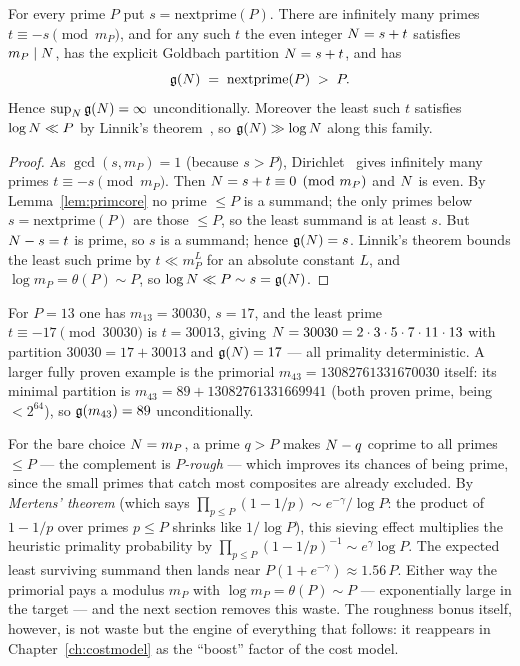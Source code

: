 \begin{theorem}\label{thm:dirichlet}
For every prime $P$ put $s=\mathrm{nextprime}(P)$. There are infinitely
many primes $t\equiv-s\pmod{m_P}$, and for any such $t$ the even integer
$N=s+t$ satisfies $m_P\mid N$, has the explicit Goldbach partition
$N=s+t$, and has
\[
\mathfrak{g}(N)\;=\;\mathrm{nextprime}(P)\;>\;P.
\]
Hence $\sup_N\mathfrak{g}(N)=\infty$ unconditionally. Moreover the least such
$t$ satisfies $\log N\ll P$ by Linnik's theorem~\cite{Linnik}, so
$\mathfrak{g}(N)\gg\log N$ along this family.
\end{theorem}
\begin{proof}
As $\gcd(s,m_P)=1$ (because $s>P$), Dirichlet~\cite{Dirichlet} gives
infinitely many primes $t\equiv-s\pmod{m_P}$. Then
$N=s+t\equiv0\pmod{m_P}$ and $N$ is even. By Lemma~\ref{lem:primcore}
no prime $\le P$ is a summand; the only primes below
$s=\mathrm{nextprime}(P)$ are those $\le P$, so the least summand is at
least $s$. But $N-s=t$ is prime, so $s$ is a summand; hence
$\mathfrak{g}(N)=s$. Linnik's theorem bounds the least such prime by
$t\ll m_P^{L}$ for an absolute constant $L$, and
$\log m_P=\theta(P)\sim P$, so $\log N\ll P\sim s=\mathfrak{g}(N)$.
\end{proof}

\begin{remark}\label{rem:concrete}
For $P=13$ one has $m_{13}=30030$, $s=17$, and the least prime
$t\equiv-17\pmod{30030}$ is $t=30013$, giving
$N=30030=2\cdot3\cdot5\cdot7\cdot11\cdot13$ with partition
$30030=17+30013$ and $\mathfrak{g}(N)=17$ --- all primality deterministic. A
larger fully proven example is the primorial
$m_{43}=13082761331670030$ itself: its minimal partition is
$m_{43}=89+13082761331669941$ (both proven prime, being $<2^{64}$), so
$\mathfrak{g}(m_{43})=89$ unconditionally.
\end{remark}

\begin{remark}\label{rem:rough}
For the bare choice $N=m_P$, a prime $q>P$ makes $N-q$ coprime to all
primes $\le P$ --- the complement is \emph{$P$-rough} --- which improves
its chances of being prime, since the small primes that catch most
composites are already excluded. By \emph{Mertens' theorem} (which says
$\prod_{p\le P}(1-1/p)\sim e^{-\gamma}/\log P$: the product of $1-1/p$
over primes $p\le P$ shrinks like $1/\log P$), this sieving effect
multiplies the heuristic primality probability by
$\prod_{p\le P}(1-1/p)^{-1}\sim e^\gamma\log P$. The expected least
surviving summand then lands near $P(1+e^{-\gamma})\approx1.56\,P$.
Either way the primorial pays a modulus $m_P$ with
$\log m_P=\theta(P)\sim P$ --- exponentially large in the target --- and
the next section removes this waste. The roughness bonus itself,
however, is not waste but the engine of everything that follows: it
reappears in Chapter~\ref{ch:costmodel} as the ``boost'' factor of the
cost model.
\end{remark}

